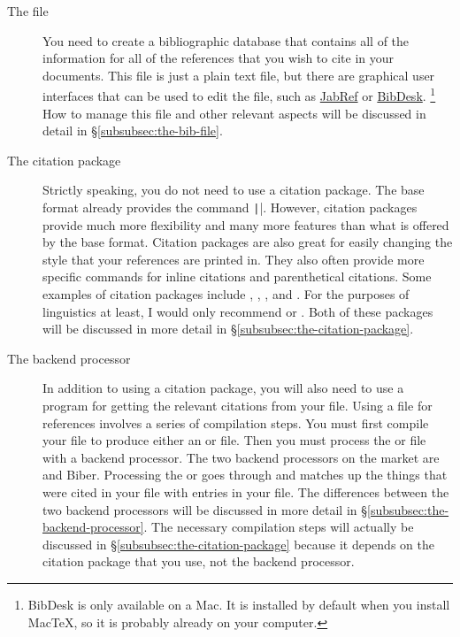 \begin{description}

	\item[The  file]{%
		You need to create a bibliographic database that contains all of the information for all of the references that you wish to cite in your  documents.
		This file is just a plain text file, but there are graphical user interfaces that can be used to edit the file, such as \href{http://jabref.sourceforge.net/}{JabRef} or \href{http://bibdesk.sourceforge.net/}{BibDesk}.%
		\footnote{%
		BibDesk is only available on a Mac.
		It is installed by default when you install {Mac\TeX}, so it is probably already on your computer.%
		}
		How to manage this file and other relevant aspects will be discussed in detail in \S\ref{subsubsec:the-bib-file}.%
	}
	
	\item[The citation package]{%
		Strictly speaking, you do not need to use a citation package.
		The base  format already provides the command \texttt|\cite{...}|.
		However, citation packages provide much more flexibility and many more features than what is offered by the base  format.
		Citation packages are also great for easily changing the style that your references are printed in.
		They also often provide more specific commands for inline citations and parenthetical citations.
		Some examples of citation packages include , , , and .
		For the purposes of linguistics at least, I would only recommend  or .
		Both of these packages will be discussed in more detail in \S\ref{subsubsec:the-citation-package}.%
	}
	
	\item[The backend processor]{%
		In addition to using a citation package, you will also need to use a program for getting the relevant citations from your  file.
		Using a  file for references involves a series of compilation steps.
		You must first compile your  file to produce either an  or  file.
		Then you must process the  or  file with a backend processor.
		The two backend processors on the market are  and Biber.
		Processing the  or  goes through and matches up the things that were cited in your  file with entries in your  file.
		The differences between the two backend processors will be discussed in more detail in \S\ref{subsubsec:the-backend-processor}.
		The necessary compilation steps will actually be discussed in \S\ref{subsubsec:the-citation-package} because it depends on the citation package that you use, not the backend processor.%
	}

\end{description}

